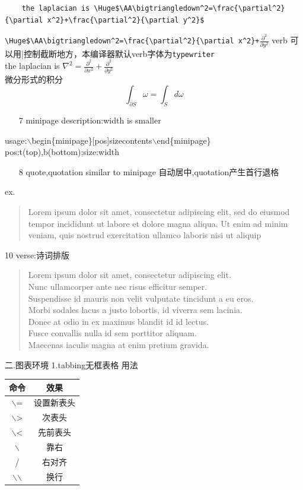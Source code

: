 \documentclass{article}[20pt]{}
\begin{document}
\begin{verbatim}
	the laplacian is \Huge$\AA\bigtriangledown^2=\frac{\partial^2}{\partial x^2}+\frac{\partial^2}{\partial y^2}$
\end{verbatim}
\verb|\Huge$\AA\bigtriangledown^2=\frac{\partial^2}{\partial x^2}+|$\frac{\partial^2}{\partial y^2}$
verb 可以用|控制截断地方，本编译器默认verb字体为{\tt typewriter}\\
the laplacian is {\Huge$\nabla^2=\frac{\partial^2}{\partial x^2}+\frac{\partial^2}{\partial y^2}$}\\
{\center 微分形式的积分} {$${\int}_{\partial S} \omega=\int_S d\omega$$}
\begin{itemize}\item [7] minipage description:width is smaller\end{itemize}\flushleft
usage:$\backslash$begin\{minipage\}[pos]{size}contents$\backslash$end\{minipage\}
\\pos:t(top),b(bottom);size:width
\begin{itemize}\item[8] quote,quotation similar to minipage 自动居中,quotation产生首行退格\end{itemize}\flushleft
ex.\begin{quote}
	Lorem ipsum dolor sit amet, consectetur adipiscing elit, sed do eiusmod tempor incididunt ut labore et dolore magna aliqua. Ut enim ad minim veniam, quis nostrud exercitation ullamco laboris nisi ut aliquip 
\end{quote}
\begin{quotation}
\lipsum[1]
\end{quotation}
10 verse:诗词排版
\begin{verse}\flushleft
Lorem ipsum dolor sit amet, consectetur adipiscing elit.\\
Nunc ullamcorper ante nec risus efficitur semper.\\
Suspendisse id mauris non velit vulputate tincidunt a eu eros.\\
Morbi sodales lacus a justo lobortis, id viverra sem lacinia.\\
Donec at odio in ex maximus blandit id id lectus.\\
Fusce convallis nulla id sem porttitor aliquam.\\
Maecenas iaculis magna at enim pretium gravida.\\
\end{verse}
二.图表环境
1.tabbing无框表格 用法
\begin{tabular}{|c|c|}\hline
	命令 & 效果 \\ \hline
	$\backslash$= & 设置新表头 \\ \hline
	$\backslash$> & 次表头 \\ \hline
	$\backslash$< & 先前表头 \\ \hline
	$\backslash$ & 靠右   \\ \hline
	/ &右对齐\\ \hline
	$\backslash$$\backslash$ &换行\\ \hline
\end{tabular}
\end{document}
